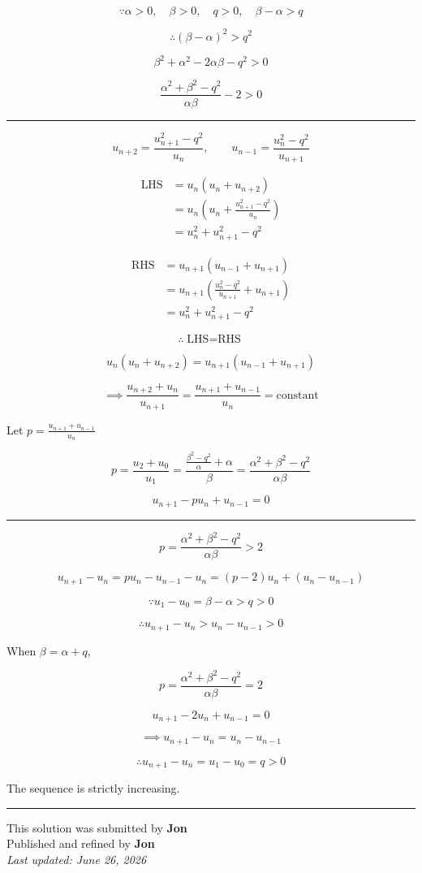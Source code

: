 \documentclass[12pt]{article}
\begin{document}
\newcommand{\ds}{\displaystyle}

$$\because \alpha>0,\quad \beta>0,\quad q>0,\quad \beta-\alpha>q$$

$$\therefore (\beta-\alpha)^2>q^2$$

$$\beta^2+\alpha^2-2\alpha\beta-q^2>0$$

$$\frac{\alpha^2+\beta^2-q^2}{\alpha\beta}-2>0$$

\bigskip\hrule\bigskip
$$u_{n+2}=\frac{u_{n+1}^2-q^2}{u_n},\qquad u_{n-1}=\frac{u_n^2-q^2}{u_{n+1}}$$

\begin{align*}
\text{LHS}
&=u_n(u_n+u_{n+2})\\
&=u_n\left(u_n+\frac{u_{n+1}^2-q^2}{u_n}\right)\\
&=u_n^2+u_{n+1}^2-q^2
\end{align*}

\begin{align*}
\text{RHS}
&=u_{n+1}(u_{n-1}+u_{n+1})\\
&=u_{n+1}\left(\frac{u_n^2-q^2}{u_{n+1}}+u_{n+1}\right)\\
&=u_n^2+u_{n+1}^2-q^2
\end{align*}

$$\therefore \boxed{\text{LHS}=\text{RHS}}$$


$$u_n(u_n+u_{n+2})=u_{n+1}(u_{n-1}+u_{n+1})$$

$$\implies \frac{u_{n+2}+u_n}{u_{n+1}}=\frac{u_{n+1}+u_{n-1}}{u_n}=\text{constant}$$

Let $\ds p=\frac{u_{n+1}+u_{n-1}}{u_n}$

$$p=\frac{u_2+u_0}{u_1}
=\frac{\frac{\beta^2-q^2}{\alpha}+\alpha}{\beta}
=\frac{\alpha^2+\beta^2-q^2}{\alpha\beta}$$

$$u_{n+1}-pu_n+u_{n-1}=0$$


\bigskip\hrule\bigskip

$$p=\frac{\alpha^2+\beta^2-q^2}{\alpha\beta}>2$$

$$u_{n+1}-u_n=pu_n-u_{n-1}-u_n=(p-2)u_n+(u_n-u_{n-1})$$

$$\because u_1-u_0=\beta-\alpha>q>0$$

$$\therefore u_{n+1}-u_n>u_n-u_{n-1}>0$$

When $\beta=\alpha+q$,

$$p=\frac{\alpha^2+\beta^2-q^2}{\alpha\beta}=2$$

$$u_{n+1}-2u_n+u_{n-1}=0$$

$$\implies u_{n+1}-u_n=u_n-u_{n-1}$$

$$\therefore u_{n+1}-u_n=u_1-u_0=q>0$$

The sequence is strictly increasing.

\bigskip
\hrule
\begin{center}
    This solution was submitted by \textbf{Jon}\\[4pt]
    Published and refined by \textbf{Jon}\\[8pt]
    \textit{Last updated: June 26, 2026}
\end{center}
\end{document}
